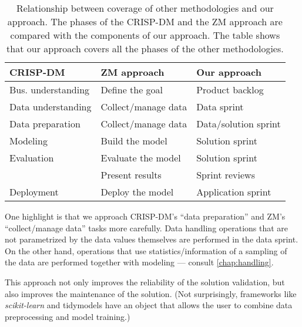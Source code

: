 \begin{table}
  \centering
  \begin{tabular}{lll}
    \toprule
    \textbf{CRISP-DM} & \textbf{ZM approach} & \textbf{Our approach} \\
    \midrule
    Bus. understanding & Define the goal & Product backlog \\
    Data understanding & Collect/manage data & Data sprint \\
    Data preparation & Collect/manage data & Data/solution sprint \\
    Modeling & Build the model & Solution sprint \\
    Evaluation & Evaluate the model & Solution sprint \\
    & Present results & Sprint reviews \\
    Deployment & Deploy the model & Application sprint \\
    \bottomrule
  \end{tabular}
  \caption{
  Relationship between coverage of other methodologies and our approach.
  The phases of the CRISP-DM and the ZM approach are compared with the components of our
  approach.  The table shows that our approach covers all the phases of the other
  methodologies.
  }
  \label{tab:phases}
\end{table}

One highlight is that we approach CRISP-DM's ``data preparation'' and ZM's
``collect/manage data'' tasks more carefully.  Data handling operations that are not
parametrized by the data values themselves are performed in the data sprint.  On the other hand,
operations that use statistics/information of a sampling of the data are performed
together with modeling --- consult \cref{chap:handling}.

This approach not only improves the reliability of the solution validation, but also improves
the maintenance of the solution.  (Not surprisingly, frameworks like \textit{scikit-learn} and
tidymodels have an object that allows the user to combine data preprocessing and
model training.)


